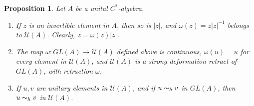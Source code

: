 \documentclass{book}
\newtheorem{proposition}[definition]{Proposition}
\def\cstar{\(C^*\)-algebra}
\begin{document}
\begin{proposition}\label{prop:5111}
  Let \(A\) be a unital \cstar.
  \begin{enumerate}
    \item If \(z\) is an invertible element in \(A\), then so is \(|z|\), and \(\omega(z)=z|z|^{-1}\) belongs to \(\mathcal{U}(A)\).
      Clearly, \(z=\omega(z)|z|\).
    \item The map \(\omega:GL(A)\rightarrow\mathcal{U}(A)\) defined above is continuous, \(\omega(u)=u\) for every element in \(\mathcal{U}(A)\), 
      and \(\mathcal{U}(A)\) is a strong deformation retract of \(GL(A)\), with retraction \(\omega\).
    \item If \(u, v\) are unitary elements in \(\mathcal{U}(A)\), and if \(u\thicksim_h v\) in \(GL(A)\), then \(u\thicksim_h v\) in \(\mathcal{U}(A)\).
  \end{enumerate}
\end{proposition}
\end{document}
